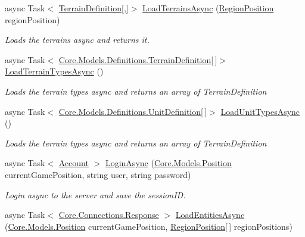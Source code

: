 \begin{DoxyCompactItemize}
\item 
async Task$<$ \hyperlink{classCore_1_1Models_1_1Definitions_1_1TerrainDefinition}{Terrain\+Definition}\mbox{[},\mbox{]}$>$ \hyperlink{classClient_1_1Common_1_1Controllers_1_1NetworkController_a5d45a3e5a8fcf0a755954d782af4e780}{Load\+Terrains\+Async} (\hyperlink{classCore_1_1Models_1_1RegionPosition}{Region\+Position} region\+Position)
\begin{DoxyCompactList}\small\item\em Loads the terrains async and returns it. \end{DoxyCompactList}\item 
async Task$<$ \hyperlink{classCore_1_1Models_1_1Definitions_1_1TerrainDefinition}{Core.\+Models.\+Definitions.\+Terrain\+Definition}\mbox{[}$\,$\mbox{]}$>$ \hyperlink{classClient_1_1Common_1_1Controllers_1_1NetworkController_a6e0ad22bc63585d4be358da45848063d}{Load\+Terrain\+Types\+Async} ()
\begin{DoxyCompactList}\small\item\em Loads the terrain types async and returns an array of Terrain\+Definition \end{DoxyCompactList}\item 
async Task$<$ \hyperlink{classCore_1_1Models_1_1Definitions_1_1UnitDefinition}{Core.\+Models.\+Definitions.\+Unit\+Definition}\mbox{[}$\,$\mbox{]}$>$ \hyperlink{classClient_1_1Common_1_1Controllers_1_1NetworkController_ab2e121298834c77bed8e204928fc21ff}{Load\+Unit\+Types\+Async} ()
\begin{DoxyCompactList}\small\item\em Loads the terrain types async and returns an array of Terrain\+Definition \end{DoxyCompactList}\item 
async Task$<$ \hyperlink{classCore_1_1Models_1_1Account}{Account} $>$ \hyperlink{classClient_1_1Common_1_1Controllers_1_1NetworkController_af3c0e3f5073dda246d20513013286919}{Login\+Async} (\hyperlink{classCore_1_1Models_1_1Position}{Core.\+Models.\+Position} current\+Game\+Position, string user, string password)
\begin{DoxyCompactList}\small\item\em Login async to the server and save the session\+I\+D. \end{DoxyCompactList}\item 
async Task$<$ \hyperlink{classCore_1_1Connections_1_1Response}{Core.\+Connections.\+Response} $>$ \hyperlink{classClient_1_1Common_1_1Controllers_1_1NetworkController_a27e260e1481b6ec9186915a9f64c3dce}{Load\+Entities\+Async} (\hyperlink{classCore_1_1Models_1_1Position}{Core.\+Models.\+Position} current\+Game\+Position, \hyperlink{classCore_1_1Models_1_1RegionPosition}{Region\+Position}\mbox{[}$\,$\mbox{]} region\+Positions)

\end{DoxyCompactItemize}
